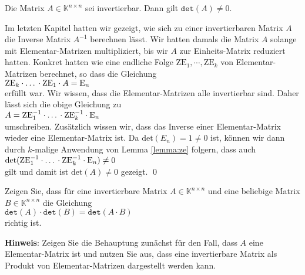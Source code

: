 \begin{Satz}
  Die Matrix $A \in \mathbb{K}^{n \times n}$ sei invertierbar.  Dann gilt $\mathtt{det}(A) \not= 0$.
\end{Satz}

\proof
Im letzten Kapitel hatten wir gezeigt, wie sich zu einer invertierbaren Matrix $A$ die Inverse
Matrix $A^{-1}$ berechnen l\"asst.   Wir hatten damals die Matrix $A$ solange mit Elementar-Matrizen
multipliziert, bis wir $A$ zur Einheits-Matrix reduziert hatten.  Konkret hatten wie eine endliche
Folge $\mathrm{ZE}_1, \cdots, \mathrm{ZE}_k$ von Elementar-Matrizen berechnet, so dass die Gleichung
\\[0.2cm]
\hspace*{1.3cm}
$\mathrm{ZE}_k \cdot \mbox{\dots} \cdot \mathrm{ZE}_1 \cdot A = \mathrm{E}_n$
\\[0.2cm]
erf\"ullt war.  Wir wissen, dass die Elementar-Matrizen alle invertierbar sind.  Daher
l\"asst sich die obige Gleichung zu
\\[0.2cm]
\hspace*{1.3cm}
$A = \mathrm{ZE}_1^{-1} \cdot \mbox{\dots} \cdot \mathrm{ZE}_k^{-1} \cdot \mathrm{E}_n$
\\[0.2cm]
umschreiben.  Zus\"atzlich wissen wir, dass das Inverse einer Elementar-Matrix wieder eine Elementar-Matrix ist. 
Da $\mathrm{det}(E_n) = 1 \not= 0$ ist, k\"onnen wir dann durch $k$-malige Anwendung von Lemma
\ref{lemma:ze} folgern, dass auch  
\\[0.2cm]
\hspace*{1.3cm}
$\mathrm{det}(\mathrm{ZE}_1^{-1} \cdot \mbox{\dots} \cdot \mathrm{ZE}_k^{-1} \cdot \mathrm{E}_n) \not = 0$
\\[0.2cm]
gilt und damit ist $\mathrm{det}(A) \not= 0$ gezeigt. \qed


\exercise
Zeigen Sie, dass f\"ur eine invertierbare Matrix $A \in \mathbb{K}^{n \times n}$ und eine beliebige
Matrix $B \in \mathbb{K}^{n \times n}$ die Gleichung
\\[0.2cm]
\hspace*{1.3cm}
$\mathtt{det}(A) \cdot \mathtt{det}(B) = \mathtt{det}(A \cdot B)$
\\[0.2cm]
richtig ist.
\vspace*{0.2cm}

\noindent
\textbf{Hinweis}:  Zeigen Sie die
Behauptung zun\"achst f\"ur den Fall, dass $A$ eine Elementar-Matrix ist und nutzen Sie aus, dass eine
invertierbare Matrix als Produkt von Elementar-Matrizen dargestellt werden kann.
\eoxs

